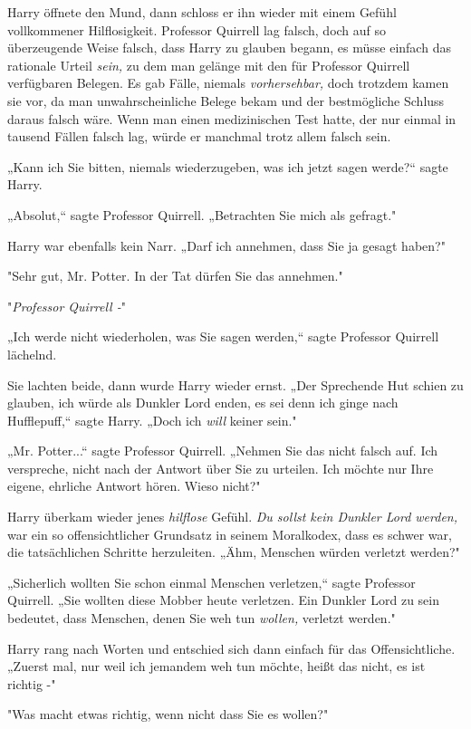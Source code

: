 {Harry öffnete den Mund, dann schloss er ihn wieder mit einem Gefühl vollkommener Hilflosigkeit. Professor Quirrell lag falsch, doch auf so überzeugende Weise falsch, dass Harry zu glauben begann, es müsse einfach das rationale Urteil \emph{sein,} zu dem man gelänge mit den für Professor Quirrell verfügbaren Belegen. Es gab Fälle, niemals \emph{vorhersehbar,} doch trotzdem kamen sie vor, da man unwahrscheinliche Belege bekam und der bestmögliche Schluss daraus falsch wäre. Wenn man einen medizinischen Test hatte, der nur einmal in tausend Fällen falsch lag, würde er manchmal trotz allem falsch sein.

„Kann ich Sie bitten, niemals wiederzugeben, was ich jetzt sagen werde?“ sagte Harry.

„Absolut,“ sagte Professor Quirrell. „Betrachten Sie mich als gefragt."

Harry war ebenfalls kein Narr. „Darf ich annehmen, dass Sie ja gesagt haben?"

"Sehr gut, Mr. Potter. In der Tat dürfen Sie das annehmen."

"\emph{Professor Quirrell -}"

„Ich werde nicht wiederholen, was Sie sagen werden,“ sagte Professor Quirrell lächelnd.

Sie lachten beide, dann wurde Harry wieder ernst. „Der Sprechende Hut schien zu glauben, ich würde als Dunkler Lord enden, es sei denn ich ginge nach Hufflepuff,“ sagte Harry. „Doch ich \emph{will} keiner sein."

„Mr. Potter...“ sagte Professor Quirrell. „Nehmen Sie das nicht falsch auf. Ich verspreche, nicht nach der Antwort über Sie zu urteilen. Ich möchte nur Ihre eigene, ehrliche Antwort hören. Wieso nicht?"

Harry überkam wieder jenes \emph{hilflose} Gefühl. \emph{Du sollst kein Dunkler Lord werden,} war ein so offensichtlicher Grundsatz in seinem Moralkodex, dass es schwer war, die tatsächlichen Schritte herzuleiten. „Ähm, Menschen würden verletzt werden?"

„Sicherlich wollten Sie schon einmal Menschen verletzen,“ sagte Professor Quirrell. „Sie wollten diese Mobber heute verletzen. Ein Dunkler Lord zu sein bedeutet, dass Menschen, denen Sie weh tun \emph{wollen,} verletzt werden."

Harry rang nach Worten und entschied sich dann einfach für das Offensichtliche. „Zuerst mal, nur weil ich jemandem weh tun möchte, heißt das nicht, es ist richtig -"

"Was macht etwas richtig, wenn nicht dass Sie es wollen?"

}
